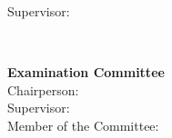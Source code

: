 \begin{titlepage}
\begin{center}
\begin{minipage}[t]{.24\textwidth}
  \center
  \begin{flushright}
    {\large Supervisor:~~}
  \end{flushright}
\end{minipage}%
\begin{minipage}[t]{.76\textwidth}
  \center
  \begin{flushleft}
    {\Supervisors}
  \end{flushleft}
\end{minipage}\\
%
\if{}
  \vspace*{\finalAdvisorsSpacing}
\else
  \vspace*{\draftAdvisorsSpacing}
\fi
%
\if{}
%
\begin{minipage}[t]{1\textwidth}
  \center
  {\Large \textbf{Examination Committee}}\\[.25cm]
  {\large Chairperson: \Chairperson}\\
  {\large Supervisor: \Advisor}\\
  {\large Member of the Committee: \CommitteeMembers}
\end{minipage}\\[1.0cm]
%
\fi
%

\if{}
 \vspace*{\dateSpacing}
\fi

{\Large \textbf{\Month\:\Year}}\\
\end{center}
\end{titlepage}
